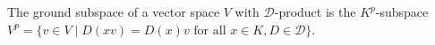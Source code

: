 The ground subspace of a vector space $V$ with $\mathcal{D}$-product is the $K^p$-subspace $V^p = \{v \in V \mid D(xv) = D(x)v \text{ for all } x \in K, D \in \mathcal{D}\}$.
